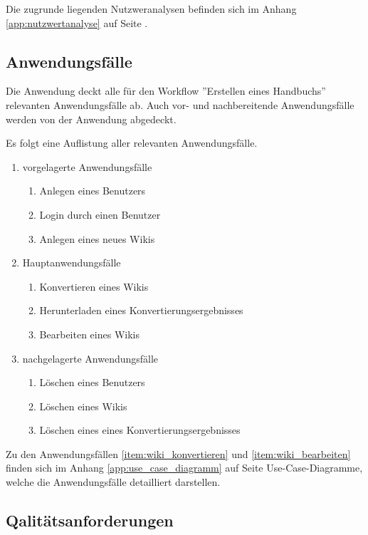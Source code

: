 \documentclass[12pt, xcolor=dvipsnames]{scrartcl}
\begin{document}
Die zugrunde liegenden Nutzweranalysen befinden sich im Anhang \ref{app:nutzwertanalyse} auf Seite \pageref{app:nutzwertanalyse}.

\subsection{Anwendungsfälle}

Die Anwendung deckt alle für den Workflow ''Erstellen eines Handbuchs'' relevanten Anwendungsfälle ab. Auch vor- und nachbereitende Anwendungsfälle werden von der Anwendung abgedeckt.

Es folgt eine Auflistung aller relevanten Anwendungsfälle.

\begin{enumerate}
	\item vorgelagerte Anwendungsfälle
	\begin{enumerate}
		\item Anlegen eines Benutzers		
		\item Login durch einen Benutzer
		\item Anlegen eines neues Wikis	
	\end{enumerate}
	\item Hauptanwendungsfälle
	\begin{enumerate}
		\item Konvertieren eines Wikis \label{item:wiki_konvertieren}
		\item Herunterladen eines Konvertierungsergebnisses
		\item Bearbeiten eines Wikis \label{item:wiki_bearbeiten}
	\end{enumerate}
	\item nachgelagerte Anwendungsfälle
	\begin{enumerate}
		\item Löschen eines Benutzers
		\item Löschen eines Wikis
		\item Löschen eines eines Konvertierungsergebnisses
	\end{enumerate}
\end{enumerate}

Zu den Anwendungsfällen \ref{item:wiki_konvertieren} und \ref{item:wiki_bearbeiten} finden sich im Anhang \ref{app:use_case_diagramm} auf Seite \pageref{app:use_case_diagramm} Use-Case-Diagramme, welche die Anwendungsfälle detailliert darstellen.


\subsection{Qalitätsanforderungen}
\end{document}
